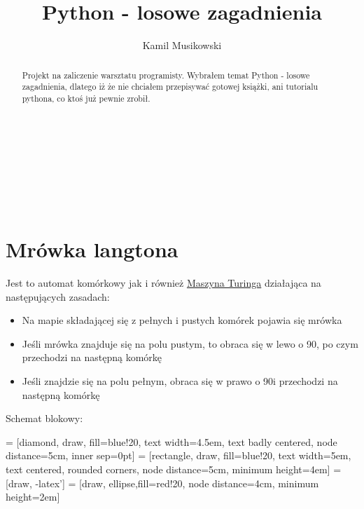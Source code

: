 \documentclass[a4paper, 12pt]{article}
\title{Python - losowe zagadnienia}
\author{Kamil Musikowski}
\begin{document}
\maketitle
\\
\begin{abstract}
   Projekt na zaliczenie warsztatu programisty.
   Wybrałem temat Python - losowe zagadnienia, dlatego iż że nie chciałem przepisywać gotowej książki, ani tutorialu pythona, co ktoś już pewnie zrobił.
\end{abstract}
\\ \\ \\
\tableofcontents

\pagebreak


\section{Mrówka langtona}

Jest to automat komórkowy jak i również \href{https://pl.wikipedia.org/wiki/Maszyna_Turinga}{Maszyna Turinga} działająca na następujących zasadach:
\begin{itemize}
    \item Na mapie składającej się z pełnych i pustych komórek pojawia się mrówka
    \item Jeśli mrówka znajduje się na polu pustym, to obraca się w lewo o 90\textdegree, po czym przechodzi na następną komórkę
    \item Jeśli znajdzie się na polu pełnym, obraca się w prawo o 90\textdegree i przechodzi na następną komórkę
\end{itemize}

\hfill 

Schemat blokowy: 
\hfill \hfill \break \hfill \hfill \break \hfill 
\begin{normalsize}
 = [diamond, draw, fill=blue!20, 
    text width=4.5em, text badly centered, node distance=5cm, inner sep=0pt]
 = [rectangle, draw, fill=blue!20, 
    text width=5em, text centered, rounded corners, node distance=5cm, minimum height=4em]
 = [draw, -latex']
 = [draw, ellipse,fill=red!20, node distance=4cm,
    minimum height=2em]
    
\end{normalsize}
\end{document}
